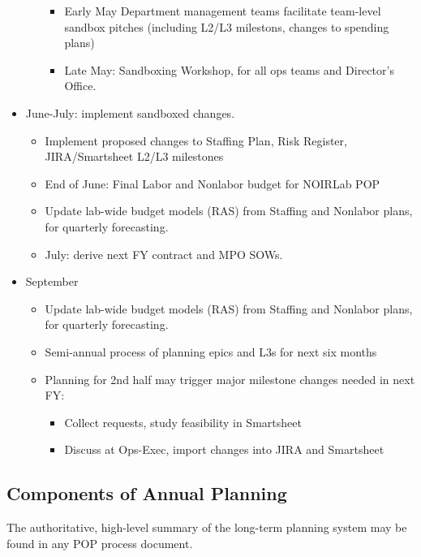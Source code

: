 \begin{itemize}
\begin{itemize}
\begin{itemize}
            \item Early May Department management teams facilitate team-level sandbox pitches (including \gls{L2}/L3 milestons, changes to spending plans)
            \item Late May: Sandboxing Workshop, for all ops teams and \gls{Director}'s Office.
         \end{itemize}
   \end{itemize}
\item June-July: implement sandboxed changes.
   \begin{itemize}
      \item Implement proposed changes to Staffing Plan, \gls{Risk} Register, \gls{JIRA}/Smartsheet \gls{L2}/L3 milestones
      \item End of June: Final Labor and Nonlabor budget for \gls{NOIRLab} \gls{POP}
      \item Update lab-wide budget models (\gls{RAS}) from Staffing and Nonlabor plans, for quarterly forecasting.
      \item July: derive next \gls{FY} contract and \gls{MPO} SOWs.
   \end{itemize}
\item September
   \begin{itemize}
      \item Update lab-wide budget models (\gls{RAS}) from Staffing and Nonlabor plans, for quarterly forecasting.
      \item Semi-annual process of planning epics and L3s for next six months
      \item Planning for 2nd half may trigger major milestone changes needed in next \gls{FY}:
      \begin{itemize}
         \item Collect requests, study feasibility in Smartsheet
         \item Discuss at Ops-Exec, import changes into \gls{JIRA} and Smartsheet
      \end{itemize}
   \end{itemize}
\end{itemize}

\subsection{Components of Annual Planning}
\label{sec:annual-planning}
The authoritative, high-level summary of the long-term planning system may be found in any POP process document.

